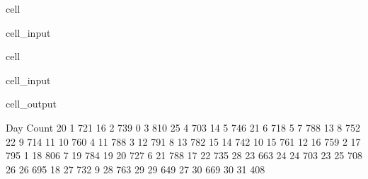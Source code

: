 \documentclass[letterpaper,10pt,english]{sphinxmanual}
\begin{document}
\begin{sphinxuseclass}{cell}
\begin{sphinxuseclass}{cell_input}
\begin{sphinxVerbatim}[commandchars=\\\{\}]
  \PYG{p}{[}\PYG{p}{]}
  
  \PYG{p}{[} \PYG{p}{]}
\end{sphinxVerbatim}

\end{sphinxuseclass}
\end{sphinxuseclass}
\begin{sphinxuseclass}{cell}
\begin{sphinxuseclass}{cell_input}
\begin{sphinxVerbatim}[commandchars=\\\{\}]
\end{sphinxVerbatim}

\end{sphinxuseclass}
\begin{sphinxuseclass}{cell_output}
\begin{sphinxVerbatim}[commandchars=\\\{\}]
    Day  Count
20    1    721
16    2    739
0     3    810
25    4    703
14    5    746
21    6    718
5     7    788
13    8    752
22    9    714
11   10    760
4    11    788
3    12    791
8    13    782
15   14    742
10   15    761
12   16    759
2    17    795
1    18    806
7    19    784
19   20    727
6    21    788
17   22    735
28   23    663
24   24    703
23   25    708
26   26    695
18   27    732
9    28    763
29   29    649
27   30    669
30   31    408
\end{sphinxVerbatim}

\end{sphinxuseclass}
\end{sphinxuseclass}
\end{document}
